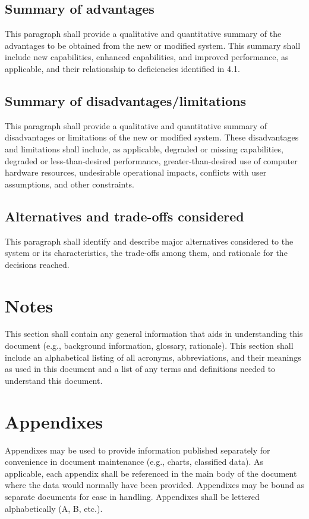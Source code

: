 \documentclass{fidata-report-template}
\begin{document}
\subsection{Summary of advantages}

This paragraph shall provide a qualitative and quantitative summary of
the advantages to be obtained from the new or modified system. This
summary shall include new capabilities, enhanced capabilities, and
improved performance, as applicable, and their relationship to
deficiencies identified in 4.1.

\subsection{Summary of disadvantages/limitations}

This paragraph shall provide a qualitative and quantitative summary of
disadvantages or limitations of the new or modified system. These
disadvantages and limitations shall include, as applicable, degraded or
missing capabilities, degraded or less-than-desired performance,
greater-than-desired use of computer hardware resources, undesirable
operational impacts, conflicts with user assumptions, and other
constraints.

\subsection{Alternatives and trade-offs considered}

This paragraph shall identify and describe major alternatives considered
to the system or its characteristics, the trade-offs among them, and
rationale for the decisions reached.

\section{Notes}

This section shall contain any general information that aids in
understanding this document (e.g., background information, glossary,
rationale). This section shall include an alphabetical listing of all
acronyms, abbreviations, and their meanings as used in this document and
a list of any terms and definitions needed to understand this document.

\appendix

\section{Appendixes}

Appendixes may be used to provide information published separately for
convenience in document maintenance (e.g., charts, classified data). As
applicable, each appendix shall be referenced in the main body of the
document where the data would normally have been provided. Appendixes
may be bound as separate documents for ease in handling. Appendixes
shall be lettered alphabetically (A, B, etc.).
\end{document}
